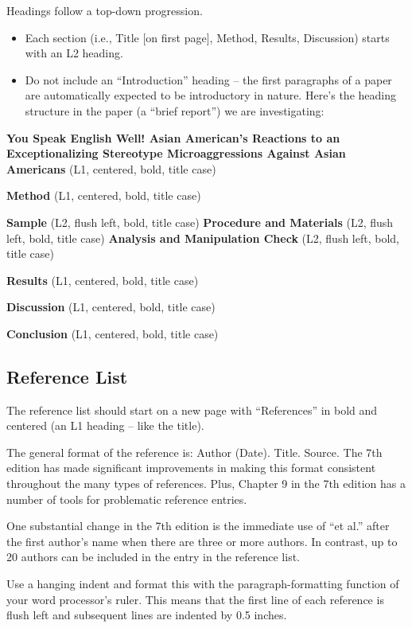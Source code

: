 \documentclass[
  11pt,
]{book}
\providecommand{\tightlist}{%
  \setlength{\itemsep}{0pt}\setlength{\parskip}{0pt}}
\begin{document}
Headings follow a top-down progression.

\begin{itemize}
\tightlist
\item
  Each section (i.e., Title {[}on first page{]}, Method, Results, Discussion) starts with an L2 heading.
\item
  Do not include an ``Introduction'' heading -- the first paragraphs of a paper are automatically expected to be introductory in nature.
  Here's the heading structure in the paper (a ``brief report'') we are investigating:
\end{itemize}

\textbf{You Speak English Well! Asian American's Reactions to an Exceptionalizing Stereotype Microaggressions Against Asian Americans} (L1, centered, bold, title case)

\textbf{Method} (L1, centered, bold, title case)

\textbf{Sample} (L2, flush left, bold, title case)
\textbf{Procedure and Materials} (L2, flush left, bold, title case)
\textbf{Analysis and Manipulation Check} (L2, flush left, bold, title case)

\textbf{Results} (L1, centered, bold, title case)

\textbf{Discussion} (L1, centered, bold, title case)

\textbf{Conclusion} (L1, centered, bold, title case)

\hypertarget{reference-list}{%
\subsection{Reference List}\label{reference-list}}

The reference list should start on a new page with ``References'' in bold and centered (an L1 heading -- like the title).

The general format of the reference is: Author (Date). Title. Source. The 7th edition has made significant improvements in making this format consistent throughout the many types of references. Plus, Chapter 9 in the 7th edition has a number of tools for problematic reference entries.

One substantial change in the 7th edition is the immediate use of ``et al.'' after the first author's name when there are three or more authors. In contrast, up to 20 authors can be included in the entry in the reference list.

Use a hanging indent and format this with the paragraph-formatting function of your word processor's ruler. This means that the first line of each reference is flush left and subsequent lines are indented by 0.5 inches.
\end{document}
